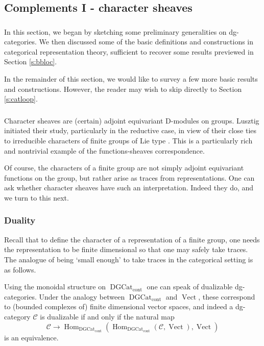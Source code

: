 \documentclass[10pt]{amsart}
\newcommand{\udHom}{\on{Hom}_{\DGCat}}
\newcommand{\on}{\operatorname}
\newcommand{\Vect}{\on{Vect}}
\theoremstyle{remark}
\numberwithin{equation}{section}
\newcommand{\sC}{\mathscr{C}}
\newcommand{\msf}{\operatorname}
\newcommand{\DGCat}{\msf{DGCat}_{\on{cont}}}
\begin{document}
\subsection{Complements I - character sheaves}

\label{ss:charsheaves}
\subsubsection{} In this section, we began by sketching some preliminary 
generalities on dg-categories. We then discussed some of the basic definitions and 
constructions in categorical representation theory, sufficient to recover some 
results previewed in Section \ref{s:bbloc}.

In the remainder of this section, we would like to survey a few more basic 
results and constructions. However, the reader may wish to skip directly to 
Section \ref{s:catloop}. 



\subsubsection{} Character sheaves are (certain) adjoint equivariant D-modules 
on groups. Lusztig initiated their study, particularly in the reductive case, in view of their close ties to irreducible characters of 
finite groups of Lie type \cite{luschar1, luschar23, luschar4, luschar5}. This is a particularly rich and nontrivial example of the 
functions-sheaves correspondence. 

Of course, the characters of a finite group are not simply adjoint equivariant 
functions on the group, but rather arise as traces from representations. One 
can ask whether character sheaves have such an interpretation. Indeed they 
do, and we turn to this next. 

\subsubsection{Duality} \label{ss:dualizable}Recall that to define the character of a 
representation of a finite group, one needs the representation to be finite 
dimensional so that one may safely take traces. The analogue of being `small enough' to take traces in the categorical setting is as follows.  




Using the monoidal structure on $\DGCat$ one can speak 
of dualizable dg-categories. Under the analogy between $\DGCat$ and $\Vect$, 
these correspond to (bounded complexes of) finite dimensional vector spaces, 
and indeed a dg-category $\sC$ is dualizable if and only if the natural map 
%
\[
     \sC \rightarrow \udHom( \udHom(\sC, \Vect), \Vect)
\] 
%
is an equivalence. 
\end{document}
